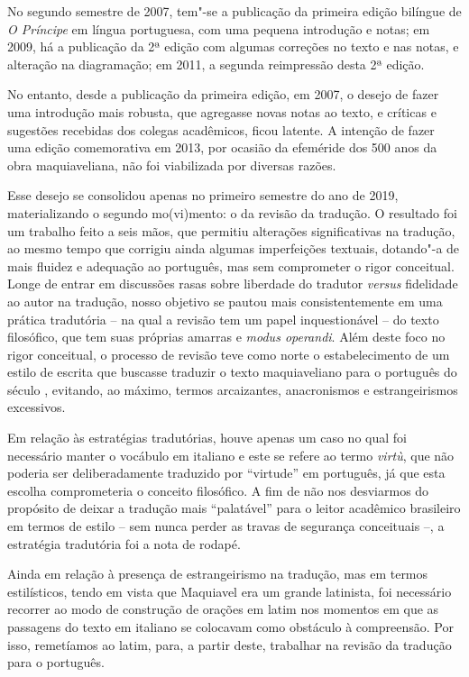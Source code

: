 No segundo semestre de 2007, tem"-se a publicação da primeira edição
bilíngue de \emph{O Príncipe} em língua portuguesa, com uma pequena
introdução e notas; em 2009, há a publicação da 2ª edição com algumas
correções no texto e nas notas, e alteração na diagramação; em 2011, a
segunda reimpressão desta 2ª edição.

No entanto, desde a publicação da primeira edição, em 2007, o desejo de
fazer uma introdução mais robusta, que agregasse novas notas ao texto, e
críticas e sugestões recebidas dos colegas acadêmicos, ficou latente. A
intenção de fazer uma edição comemorativa em 2013, por ocasião da
efeméride dos 500 anos da obra maquiaveliana, não foi viabilizada por
diversas razões.

Esse desejo se consolidou apenas no primeiro semestre do ano de 2019,
materializando o segundo mo(vi)mento: o da revisão da tradução. O
resultado foi um trabalho feito a seis mãos, que permitiu alterações
significativas na tradução, ao mesmo tempo que corrigiu ainda algumas
imperfeições textuais, dotando"-a de mais fluidez e adequação ao
português, mas sem comprometer o rigor conceitual. Longe de entrar em
discussões rasas sobre liberdade do tradutor \emph{versus} fidelidade ao
autor na tradução, nosso objetivo se pautou mais consistentemente em uma
prática tradutória -- na qual a revisão tem um papel inquestionável --
do texto filosófico, que tem suas próprias amarras e \emph{modus
operandi}. Além deste foco no rigor conceitual, o processo de revisão
teve como norte o estabelecimento de um estilo de escrita que buscasse
traduzir o texto maquiaveliano para o português do século , evitando,
ao máximo, termos arcaizantes, anacronismos e estrangeirismos
excessivos.

Em relação às estratégias tradutórias, houve apenas um caso no qual foi
necessário manter o vocábulo em italiano e este se refere ao termo
\emph{virtù}, que não poderia ser deliberadamente traduzido por
``virtude'' em português, já que esta escolha comprometeria o conceito
filosófico. A fim de não nos desviarmos do propósito de deixar a
tradução mais ``palatável'' para o leitor acadêmico brasileiro em termos
de estilo -- sem nunca perder as travas de segurança conceituais --, a
estratégia tradutória foi a nota de rodapé.

Ainda em relação à presença de estrangeirismo na tradução, mas em termos
estilísticos, tendo em vista que Maquiavel era um grande latinista, foi
necessário recorrer ao modo de construção de orações em latim nos
momentos em que as passagens do texto em italiano se colocavam como
obstáculo à compreensão. Por isso, remetíamos ao latim, para, a partir
deste, trabalhar na revisão da tradução para o português.

